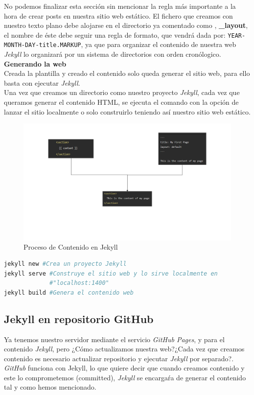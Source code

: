 No podemos finalizar esta sección sin mencionar la regla más importante a la hora de crear posts en nuestra sitio web estático. El fichero que creamos con nuestro texto plano debe alojarse en el directorio ya comentado como , \textbf{\_layout}, el nombre de éste debe seguir una regla de formato, que vendrá dada por: \texttt{YEAR-MONTH-DAY-title.MARKUP}, ya que para organizar el contenido de nuestra web \emph{Jekyll} lo organizará por un sistema de directorios con orden cronólogico.  \\
\textbf{\large{Generando la web}}\\
Creada la plantilla y creado el contenido solo queda generar el sitio web, para ello basta con ejecutar \emph{Jekyll}.\\
Una vez que creamos un directorio como nuestro proyecto \emph{Jekyll}, cada vez que queramos generar el contenido HTML, se ejecuta el comando con la opción de lanzar el sitio localmente o solo construirlo teniendo así nuestro sitio web estático.
\begin{figure}[h]
    \centering
    \includegraphics[width=\textwidth]{img/jekyll_process2.png}
    \caption{Proceso de Contenido en Jekyll}
    \label{fig:jekyllProc2}
\end{figure}
\begin{lstlisting}[language=sh]
jekyll new #Crea un proyecto Jekyll
jekyll serve #Construye el sitio web y lo sirve localmente en
             #"localhost:1400"
jekyll build #Genera el contenido web
\end{lstlisting}
\subsection*{Jekyll en repositorio GitHub}
\label{subsec:jekandGit}
Ya tenemos nuestro servidor mediante el servicio \emph{GitHub Pages}, y para el contenido \emph{Jekyll}, pero ¿Cómo actualizamos nuestra web?¿Cada vez que creamos contenido es necesario actualizar repositorio y ejecutar \emph{Jekyll} por separado?. \\
\emph{GitHub} funciona con Jekyll, lo que quiere decir que cuando creamos contenido y este lo comprometemos (committed), \emph{Jekyll} se encargaŕa de generar el contenido tal y como hemos mencionado.
